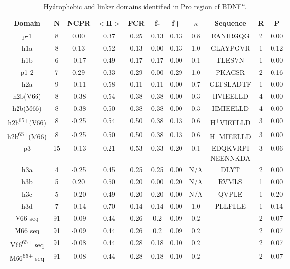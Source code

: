 \documentclass[journal=jacsat,manuscript=article]{achemso}
\begin{document}
\begin{table}[ht]
\caption{Hydrophobic and linker domains identified in Pro region of BDNF\textsuperscript{\emph{a}}.}
\begin{center}
\begin{tabular}{|c|c|c|c|c|c|c|c|c|c|c|}
\hline
Domain &  N & NCPR  & $<$H$>$  & FCR  & f- & f+ & $\kappa$  & Sequence & R & P\\
\hline\hline
p-1 & 8 & 0.00 & 0.37 & 0.25 & 0.13 & 0.13 & 0.8 &  EANIRGQG & 2 & 0.00\\
\hline
h1a & 8 & 0.13 & 0.52 & 0.13 & 0.00 & 0.13 & 1.0 &  GLAYPGVR & 1 & 0.12\\
\hline
h1b & 6 & -0.17 & 0.49 & 0.17 & 0.17 & 0.00 & 0.1 &  TLESVN & 1 & 0.00\\
\hline
p1-2 & 7 & 0.29 & 0.33 & 0.29 & 0.00 & 0.29 & 1.0 &  PKAGSR & 2 & 0.16\\
\hline
h2a & 9 & -0.11 & 0.58 & 0.11 & 0.11 & 0.00 & 0.7 & GLTSLADTF & 1 & 0.00\\
\hline
h2b(V66) & 8 & -0.38 & 0.54& 0.38 & 0.38 & 0.00 & 0.3 &  HVIEELLD & 4 & 0.00\\
\hline
h2b(M66) & 8 & -0.38 & 0.50 & 0.38 & 0.38 & 0.00 & 0.3 &  HMIEELLD & 4 & 0.00\\
\hline
h2b\textsuperscript{65+}(V66)	&8	& -0.25&	0.54&	0.50&	0.38	&0.13	&0.6	&H\textsuperscript{+}VIEELLD	&3 & 0.00\\
\hline
h2b\textsuperscript{65+}(M66)	&8	& -0.25&	0.50 &	0.50&	0.38	&0.13	&0.6	&H\textsuperscript{+}MIEELLD	&3 & 0.00\\
\hline
p3 & 15 & -0.13 & 0.21 & 0.53 & 0.33 & 0.20 & 0.1 & \makecell{EDQKVRPI \\ NEENNKDA} & 3 & 0.06\\
\hline
h3a & 4 & -0.25 & 0.45 & 0.25 & 0.25 & 0.00 & N/A &  DLYT & 2 & 0.00\\
\hline
h3b & 5 & 0.20 & 0.60 & 0.20 & 0.00 & 0.20 & N/A &  RVMLS & 1 & 0.00\\
\hline
h3c & 5 & -0.20 & 0.49 & 0.20 & 0.20 & 0.00 &N/A &  QVPLE & 1 & 0.20\\
\hline
h3d & 7 & -0.14 & 0.70 & 0.14 & 0.14 & 0.00 & 1.0 &  PLLFLLE & 1& 0.14\\
\hline\hline\hline
V66 seq  & 91 & -0.09 & 0.44 & 0.26 & 0.2 & 0.09 & 0.2 & & 2 &0.07 \\
\hline
M66 seq & 91 & -0.09 & 0.44 & 0.26 & 0.2 & 0.09 & 0.2 & & 2 &0.07 \\
\hline
V66\textsuperscript{65+} seq & 91 & -0.08 & 0.44 & 0.28 & 0.18 & 0.10 & 0.2 & & 2 & 0.07\\
\hline
M66\textsuperscript{65+} seq & 91 & -0.08 & 0.44 & 0.28 & 0.18 & 0.10 & 0.2 & & 2 &0.07\\
\hline
\end{tabular}
\end{center}


\end{table}
\end{document}
